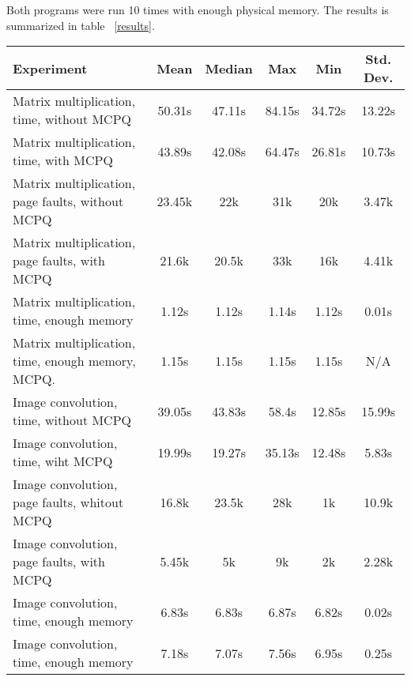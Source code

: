 \documentclass[10pt,a4paper,twocolumn]{article}
\begin{document}
Both programs were run 10 times with enough physical memory. The results is summarized in table
~\ref{results}.

\begin{table*}[htbp]
\centering
{\small 
\begin{tabular}{|l|c|c|c|c|c|}\hline
\textbf{Experiment} & \textbf{Mean} & \textbf{Median} & \textbf{Max} & \textbf{Min} & \textbf{Std. Dev.}\\ \hline \hline
Matrix multiplication, time, without MCPQ & 50.31s & 47.11s & 84.15s & 34.72s & 13.22s \\ \hline
Matrix multiplication, time, with MCPQ & 43.89s & 42.08s & 64.47s & 26.81s & 10.73s \\ \hline \hline

Matrix multiplication, page faults, without MCPQ & 23.45k & 22k & 31k & 20k & 3.47k \\ \hline
Matrix multiplication, page faults, with MCPQ& 21.6k & 20.5k & 33k & 16k & 4.41k \\ \hline \hline

Matrix multiplication, time, enough memory & 1.12s & 1.12s & 1.14s & 1.12s & 0.01s \\ \hline
Matrix multiplication, time, enough memory, MCPQ. & 1.15s & 1.15s & 1.15s & 1.15s & N/A \\ \hline
\hline

Image convolution, time, without MCPQ & 39.05s & 43.83s & 58.4s & 12.85s & 15.99s \\ \hline
Image convolution, time, wiht MCPQ & 19.99s & 19.27s & 35.13s & 12.48s & 5.83s \\ \hline \hline

Image convolution, page faults, whitout MCPQ & 16.8k & 23.5k & 28k & 1k & 10.9k \\ \hline
Image convolution, page faults, with MCPQ & 5.45k & 5k & 9k & 2k & 2.28k \\ \hline \hline

Image convolution, time, enough memory & 6.83s & 6.83s & 6.87s & 6.82s & 0.02s \\ \hline
Image convolution, time, enough memory & 7.18s & 7.07s & 7.56s & 6.95s & 0.25s \\ \hline
\end{tabular}
}
\caption{\emph{\small Summary of results. The results for the page fault experiments are in
thousands of page faults. The result of the timing experiments are in seconds. All the results for
the matrix multiplication with enough memory experiment were the same, so the standard deviation is
undefined.}}
\label{results}
\end{table*}
\end{document}
